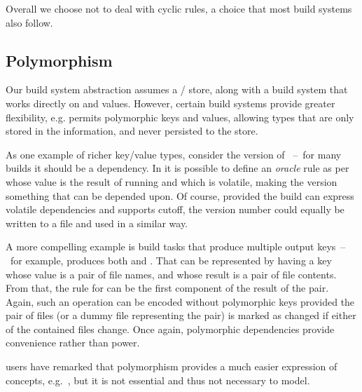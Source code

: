 Overall we choose not to deal with cyclic rules, a choice that most build
systems also follow.

\subsection{Polymorphism}\label{sec-polymorphism}

Our build system abstraction assumes a / store, along with a build
system that works directly on  and  values. However, certain build
systems provide greater flexibility, e.g. \Shake permits polymorphic keys and
values, allowing types that are only stored in the \Shake information, and never
persisted to the store.

As one example of richer key/value types, consider the version of
~--~for many builds it should be a dependency. In \Shake it is possible
to define an \emph{oracle} rule as per~\cite{mitchell2012shake} whose value is
the result of running  and which is volatile, making the
 version something that can be depended upon. Of course, provided the
build can express volatile dependencies and supports cutoff, the version number
could equally be written to a file and used in a similar way.

A more compelling example is build tasks that produce multiple output
keys~--~for example,  produces both  and .
That can be represented by having a key whose value is a pair of file names, and
whose result is a pair of file contents. From that, the rule for 
can be the first component of the result of the pair. Again, such an operation
can be encoded without polymorphic keys provided the pair of files (or a dummy
file representing the pair) is marked as changed if either of the contained
files change. Once again, polymorphic dependencies provide convenience rather
than power.

\Shake users have remarked that polymorphism provides a much easier expression
of concepts, e.g.~\cite{hadrian}, but it is not essential and thus not necessary
to model.
